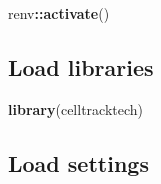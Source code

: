 \documentclass[
]{book}
\newenvironment{Shaded}{\begin{snugshade}}{\end{snugshade}}
\newcommand{\FunctionTok}[1]{\textcolor[rgb]{0.13,0.29,0.53}{\textbf{#1}}}
\newcommand{\NormalTok}[1]{#1}
\newcommand{\SpecialCharTok}[1]{\textcolor[rgb]{0.81,0.36,0.00}{\textbf{#1}}}
\begin{document}
\begin{Shaded}
\begin{Highlighting}[]
\NormalTok{renv}\SpecialCharTok{::}\FunctionTok{activate}\NormalTok{()}
\end{Highlighting}
\end{Shaded}

\subsection{Load libraries}\label{load-libraries}

\begin{Shaded}
\begin{Highlighting}[]
\FunctionTok{library}\NormalTok{(celltracktech)}
\end{Highlighting}
\end{Shaded}

\subsection{Load settings}\label{load-settings-3}
\end{document}
